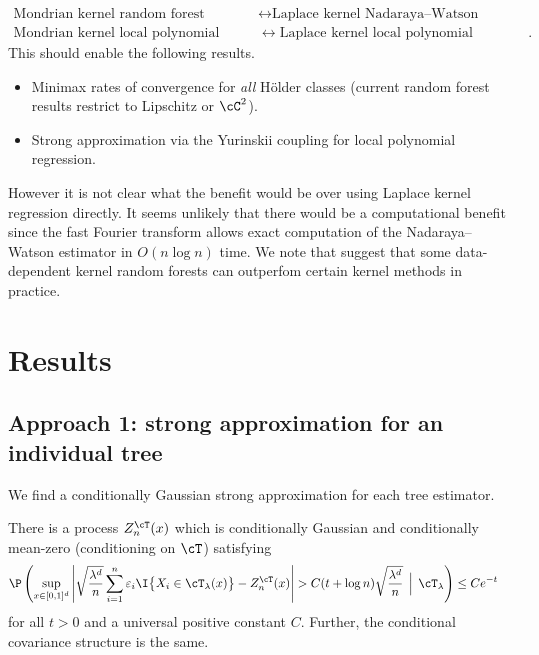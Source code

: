 \documentclass{article}
\begin{document}
%
\begin{align*}
  \text{Mondrian kernel random forest}
  &\longleftrightarrow
    \text{Laplace kernel Nadaraya--Watson} \\
  \text{Mondrian kernel local polynomial regression}
  &\longleftrightarrow
    \text{Laplace kernel local polynomial regression}.
\end{align*}
%
This should enable the following results.
%
\begin{itemize}

  \item
    Minimax rates of convergence for \emph{all} H{\"o}lder classes
    (current random forest results restrict to Lipschitz or $\cC^2$).

  \item
    Strong approximation via the Yurinskii coupling
    for local polynomial regression.

\end{itemize}
%
However it is not clear what the benefit would be over using
Laplace kernel regression directly.
It seems unlikely that there would be a computational benefit
since the fast Fourier transform allows exact computation of
the Nadaraya--Watson estimator in $O(n \log n)$ time.
We note that \cite{davies2014random}
suggest that some data-dependent kernel random forests
can outperfom certain kernel methods in practice.




\section{Results}

\subsection{Approach 1: strong approximation
  for an individual tree}

We find a conditionally Gaussian strong approximation for each
tree estimator.

\begin{lemma}
  \label{lem:kmt}

  There is a process $Z_n^\cT(x)$ which is conditionally
  Gaussian and conditionally mean-zero (conditioning on $\cT$)
  satisfying
  \begin{align*}
    \P\left(
    \sup_{x \in [0,1]^d}
    \left|
    \sqrt{\frac{\lambda^d}{n}}
    \sum_{i=1}^n
    \varepsilon_i
    \I\big\{ X_i \in \cT_\lambda(x) \big\}
    - Z^\cT_n(x)
    \right|
    > C (t + \log n)
    \sqrt{\frac{\lambda^d}{n}}
    \, \Bigm| \,
    \cT_\lambda
    \right)
    &\leq
      C e^{-t}
  \end{align*}
  for all $t>0$ and a universal positive constant $C$.
  Further, the conditional covariance structure is the same.

\end{lemma}
\end{document}
